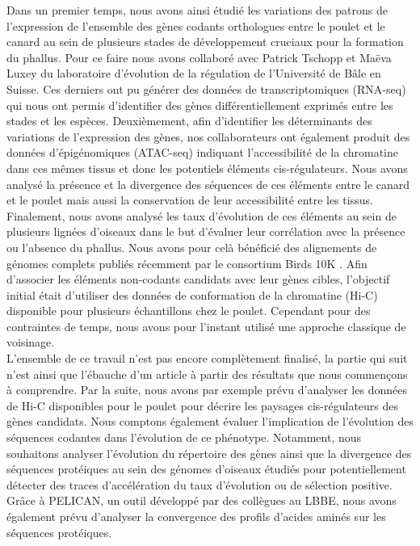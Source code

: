 Dans un premier temps, nous avons ainsi étudié les variations des patrons de l’expression de l’ensemble des gènes codants orthologues entre le poulet et le canard au sein de plusieurs stades de développement cruciaux pour la formation du phallus. Pour ce faire nous avons collaboré avec Patrick Tschopp et Maëva Luxey du laboratoire d’évolution de la régulation de l’Université de Bâle en Suisse. Ces derniers ont pu générer des données de transcriptomiques (\acrshort{RNA-seq}) qui nous ont permis d’identifier des gènes différentiellement exprimés entre les stades et les espèces. Deuxièmement, afin d’identifier les déterminants des variations de l’expression des gènes, nos collaborateurs ont également produit des données d’épigénomiques (\acrshort{ATAC-seq}) indiquant l’accessibilité de la chromatine dans ces mêmes tissus et donc les potentiels éléments \acrshort{cis}-régulateurs. Nous avons analysé la présence et la divergence des séquences de ces éléments entre le canard et le poulet mais aussi la conservation de leur accessibilité entre les tissus. Finalement, nous avons analysé les taux d’évolution de ces éléments au sein de plusieurs lignées d’oiseaux dans le but d’évaluer leur corrélation avec la présence ou l’absence du phallus. Nous avons pour celà bénéficié des alignements de génomes complets publiés récemment par le consortium Birds 10K \citep{feng_dense_2020}. Afin d’associer les éléments non-codants candidats avec leur gènes cibles, l’objectif initial était d’utiliser des données de conformation de la chromatine (\acrshort{Hi-C}) disponible pour plusieurs échantillons chez le poulet. Cependant pour des contraintes de temps, nous avons pour l’instant utilisé une approche classique de voisinage. \\

L’ensemble de ce travail n’est pas encore complètement finalisé, la partie qui suit n’est ainsi que l’ébauche d’un article à partir des résultats que nous commençons à comprendre. Par la suite, nous avons par exemple prévu d’analyser les données de \acrshort{Hi-C} disponibles pour le poulet pour décrire les paysages \acrshort{cis}-régulateurs des gènes candidats. Nous comptons également évaluer l’implication de l’évolution des séquences codantes dans l’évolution de ce phénotype. Notamment, nous souhaitons analyser l’évolution du répertoire des gènes ainsi que la divergence des séquences protéiques au sein des génomes d’oiseaux étudiés pour potentiellement détecter des traces d’accélération du taux d’évolution ou de sélection positive. Grâce à PELICAN, un outil développé par des collègues au LBBE, nous avons également prévu d’analyser la convergence des profils d’acides aminés sur les séquences protéiques.\\

